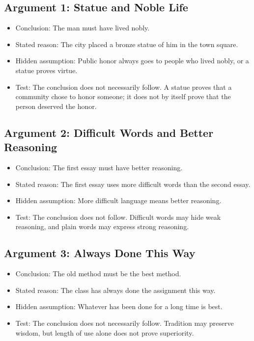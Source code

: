 \documentclass[12pt]{article}
\begin{document}
\subsection*{Argument 1: Statue and Noble Life}
\begin{itemize}[leftmargin=*]
\item Conclusion: The man must have lived nobly.
\item Stated reason: The city placed a bronze statue of him in the town square.
\item Hidden assumption: Public honor always goes to people who lived nobly, or a statue proves virtue.
\item Test: The conclusion does not necessarily follow. A statue proves that a community chose to honor someone; it does not by itself prove that the person deserved the honor.
\end{itemize}

\subsection*{Argument 2: Difficult Words and Better Reasoning}
\begin{itemize}[leftmargin=*]
\item Conclusion: The first essay must have better reasoning.
\item Stated reason: The first essay uses more difficult words than the second essay.
\item Hidden assumption: More difficult language means better reasoning.
\item Test: The conclusion does not follow. Difficult words may hide weak reasoning, and plain words may express strong reasoning.
\end{itemize}

\subsection*{Argument 3: Always Done This Way}
\begin{itemize}[leftmargin=*]
\item Conclusion: The old method must be the best method.
\item Stated reason: The class has always done the assignment this way.
\item Hidden assumption: Whatever has been done for a long time is best.
\item Test: The conclusion does not necessarily follow. Tradition may preserve wisdom, but length of use alone does not prove superiority.
\end{itemize}
\end{document}
